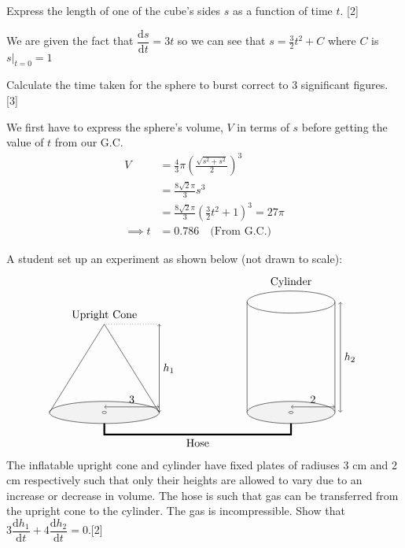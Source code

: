 \documentclass[12pt, a4 paper]{article}
\begin{document}
\begin{outline}[enumerate]
 \2 Express the length of one of the cube's sides $s$ as a function of time $t$. \hfill[2]
 \begin{answer}
  We are given the fact that $\dfrac{\mathrm{d}s}{\mathrm{d}t}=3t$ so we can see that $s=\frac{3}{2}t^2+C$ where $C$ is $s|_{t=0}=1$
 \end{answer}

 \2 Calculate the time taken for the sphere to burst correct to 3 significant figures. \hfill[3]
 \begin{answer}
  We first have to express the sphere's volume, $V$ in terms of $s$ before getting the value of $t$ from our G.C.
  \begin{align*}
   V          & = \frac{4}{3}\pi \left(\frac{\sqrt{s^2+s^2}}{2}\right)^3      \\
              & = \frac{8\sqrt2\pi}{3}s^3                                     \\
              & = \frac{8\sqrt2\pi}{3}\left(\frac{3}{2}t^2+1\right)^3 = 27\pi \\
   \implies t & = 0.786 \quad\textrm{(From G.C.)}\quad
  \end{align*}
 \end{answer}

 \1 A student set up an experiment as shown below (not drawn to scale):
 \[
  \begin{tikzpicture}
   \filldraw[color=white!90!gray,draw=black] (0,0) ellipse (50pt and 10pt);
   \draw[<->](0,5pt) -- (25pt,5pt) node[above]{3} --   (50pt,5pt);
   \draw[<->](50pt,0pt) -- (50pt,40pt) node[right]{$h_{1}$} --   (50pt,80pt);
   \draw[dotted](50pt,80pt) -- (0,80pt);
   \draw (-50pt,0) -- (0,80pt) node[above]{Upright Cone} -- (50pt,0);
   \draw (130pt,0) -- (130pt,100pt);
   \draw (210pt,0) -- (210pt,100pt);
   \filldraw[color=white!90!gray,draw=black] (170pt,0) ellipse (40pt and 10pt);
   \draw[<->](170pt,5pt) -- (190pt,5pt) node[above]{2} --   (210pt,5pt);
   \draw[<->](215pt,0pt) -- (215pt,50pt) node[right]{$h_{2}$} --   (215pt,100pt);
   \draw (170pt, 110pt) node[above] {Cylinder};
   \draw (170pt,100pt) ellipse (40pt and 10pt);
   \draw[ultra thick] (0,-10pt) -- (0,-20pt) -- (85pt,-20pt) node[below]{Hose} -- (170pt,-20pt) -- (170pt, -10pt);
   \filldraw[color=white,draw=black] (0,0) ellipse (2pt and 1pt);
   \filldraw[color=white,draw=black] (170pt,0) ellipse (2pt and 1pt);
  \end{tikzpicture}
 \]
 The inflatable upright cone and cylinder have fixed plates of radiuses 3 cm and 2 cm  respectively such that only their heights are allowed to vary due to an increase or decrease in volume. The hose is such that gas can be transferred from the upright cone to the cylinder. The gas is incompressible. %
 \2 Show that $3\dfrac{\mathrm{d}h_{1}}{\mathrm{d}t}+4\dfrac{\mathrm{d}h_{2}}{\mathrm{d}t}=0$.\hfill[2]


\end{outline}
\end{document}
